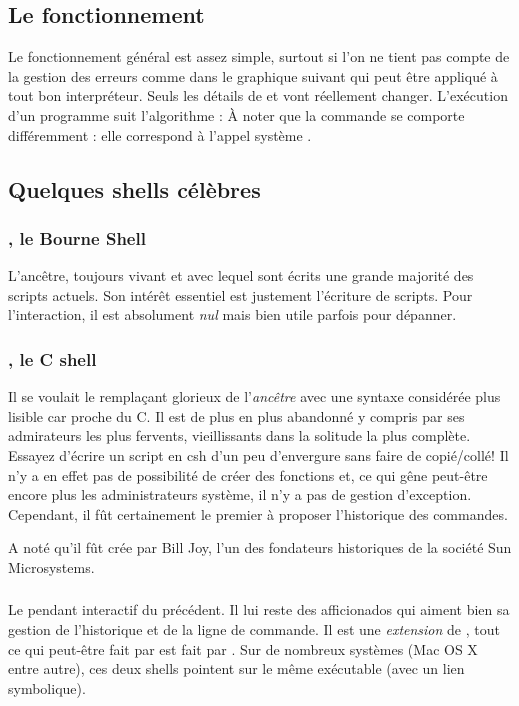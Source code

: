 \subsection{Le fonctionnement}
Le fonctionnement général est assez simple, surtout si l'on ne tient pas compte de la gestion des erreurs comme dans le graphique suivant qui peut être appliqué à tout bon interpréteur. Seuls les détails de  et  vont réellement changer.
L'exécution d'un programme suit l'algorithme :
À noter que la commande  se comporte différemment : elle correspond à l'appel système .

\subsection{Quelques shells célèbres}
\subsubsection{\sh, le Bourne Shell}
L'ancêtre, toujours vivant et avec lequel sont écrits une grande majorité des scripts actuels. Son intérêt essentiel est justement l'écriture de scripts. Pour l'interaction, il est absolument \emph{nul} mais bien utile parfois pour dépanner.

\subsubsection{\csh, le C shell}
Il se voulait le remplaçant glorieux de l'\emph{ancêtre} \sh avec une syntaxe considérée plus lisible car proche du C. Il est de plus en plus abandonné y compris par ses admirateurs les plus fervents, vieillissants dans la solitude la plus complète. Essayez d'écrire un script en csh d'un peu d'envergure sans faire de copié/collé! Il n'y a en effet pas de possibilité de créer des fonctions et, ce qui gêne peut-être encore plus les administrateurs système, il n'y a pas de gestion d'exception.  Cependant, il fût certainement le premier à proposer l'historique des commandes.

A noté qu'il fût crée par Bill Joy, l'un des fondateurs historiques de la société Sun Microsystems.

\subsubsection{\tcsh}
Le pendant interactif du précédent. Il lui reste des afficionados qui aiment bien sa gestion de l'historique et de la ligne de commande.  Il est une \emph{extension} de \csh, \ie tout ce qui peut-être fait par \csh est fait par \tcsh. Sur de nombreux systèmes (Mac OS X  entre autre), ces deux shells pointent sur le même exécutable (avec un lien symbolique).

